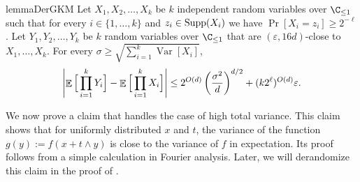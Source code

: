 \documentclass{toc}
\def\eps{\varepsilon}
\def\Blocklength{\ell}
\def\Supp{\textnormal{Supp}}
\DeclarePairedDelimiter{\abs}{\lvert}{\rvert}
\DeclareMathOperator*{\E}{\mathbb{E}}                 %
\DeclareMathOperator*{\Var}{Var}                 %
\begin{document}
  \begin{restatable}{lemma}{DerGKM} \label{lemma-GKM-Der}
    Let $X_1, X_2, \ldots, X_k$ be $k$ independent random variables over $\C_{\le 1}$ such that for every $i \in \{1, \ldots, k\}$ and $z_i \in \Supp(X_i)$ we have $\Pr[X_i = z_i] \ge 2^{-\Blocklength}$.
    Let $Y_1, Y_2, \ldots, Y_k$ be $k$ random variables over $\C_{\le 1}$ that are $(\eps, 16d)$-close to $X_1, \ldots, X_k$.
    For every $\sigma \ge \sqrt{\sum_{i=1}^k \Var[X_i]}$, 
    \[
      \abs*{ \E \Big[ \prod_{i=1}^k Y_i \Big] - \E \Big[ \prod_{i=1}^k X_i \Big] }
      \le 2^{O(d)} \left( \frac{\sigma^2}{d} \right)^{d/2} + (k 2^\Blocklength)^{O(d)} \eps.
    \]
  \end{restatable}

  We now prove a claim that handles the case of high total variance.
  This claim shows that for uniformly distributed $x$ and $t$, the variance of
  the function $g(y) := f(x + t \wedge y)$ is close to the variance of $f$ in expectation.
  Its proof follows from a simple calculation in Fourier analysis.
  Later, we will derandomize this claim in the proof of .
\end{document}
